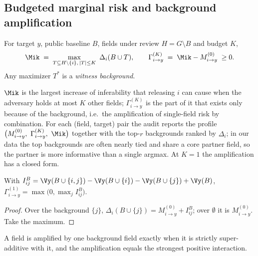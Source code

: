 \subsection{Budgeted marginal risk and background amplification}
\begin{definition}\label{def:mk}
For target $y$, public baseline $B$, fields under review $H=G\setminus B$ and budget $K$,
\begin{equation}\label{eq:mk}
\Mik \;=\; \max_{T \subseteq H \setminus \{i\},\, |T| \le K}\ \Delta_i(B\cup T),
\qquad
\Gamma^{(K)}_{i\to y} \;=\; \Mik - M^{(0)}_{i\to y} \;\ge 0 .
\end{equation}
Any maximizer $T^{*}$ is a \emph{witness background}.
\end{definition}
$\Mik$ is the largest increase of inferability that releasing $i$ can cause when the adversary
holds at most $K$ other fields; $\Gamma^{(K)}_{i\to y}$ is the part of it that exists only because of
the background, i.e.\ the amplification of single-field risk by combination. For each (field,
target) pair the audit reports the profile $\big(M^{(0)}_{i\to y},\ \Gamma^{(K)}_{i\to y},\ \Mik\big)$
together with the top-$r$ backgrounds ranked by $\Delta_i$; in our data the top backgrounds are
often nearly tied and share a core partner field, so the partner is more informative than a
single argmax. At $K=1$ the amplification has a closed form.

\begin{proposition}[Amplification at $K=1$]\label{prop:k1}
With $I^B_{ij}=\Vy(B\cup\{i,j\})-\Vy(B\cup\{i\})-\Vy(B\cup\{j\})+\Vy(B)$,
$\Gamma^{(1)}_{i\to y}=\max\big(0,\max_{j} I^{B}_{ij}\big)$.
\end{proposition}
\begin{proof}
Over the background $\{j\}$, $\Delta_i(B\cup\{j\})=M^{(0)}_{i\to y}+I^B_{ij}$; over $\emptyset$ it is
$M^{(0)}_{i\to y}$. Take the maximum.
\end{proof}
A field is amplified by one background field exactly when it is strictly super-additive with it,
and the amplification equals the strongest positive interaction.

